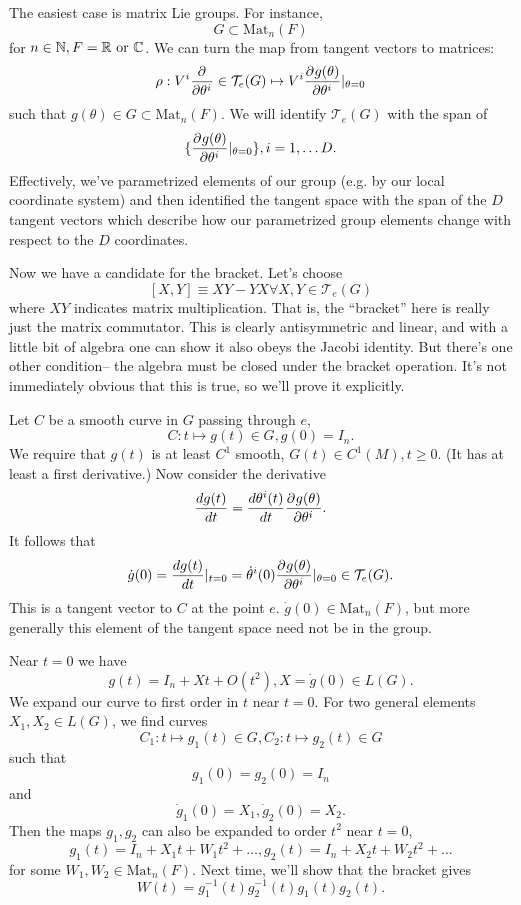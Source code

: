 \begin{exm}
The easiest case is matrix Lie groups. For instance,
$$G\subset \text{Mat}_n(F)$$
for $n\in \NN, F= \RR \text{ or } \CC$. We can turn the map from tangent vectors to matrices:
$$\rho: V^i \P{}{{\theta^i}} \in \mathcal{T}_e(G) \mapsto V^i \P{g(\theta)}{{\theta^i}} |_{\theta=0}$$
such that $g(\theta)\in G \subset \text{Mat}_n(F)$. We will identify $\mathcal{T}_e(G)$ with the span of
$$\set{\P{g(\theta)}{{\theta^i}}|_{\theta=0}},i=1,\ldots D.$$
Effectively, we've parametrized elements of our group (e.g. by our local coordinate system) and then identified the tangent space with the span of the $D$ tangent vectors which describe how our parametrized group elements change with respect to the $D$ coordinates.

Now we have a candidate for the bracket. Let's choose
$$[X,Y]\equiv XY-YX \forall X,Y \in \mathcal{T}_e(G)$$
where $XY$ indicates matrix multiplication. That is, the ``bracket'' here is really just the matrix commutator. This is clearly antisymmetric and linear, and with a little bit of algebra one can show it also obeys the Jacobi identity. But there's one other condition-- the algebra must be closed under the bracket operation. It's not immediately obvious that this is true, so we'll prove it explicitly.

Let $C$ be a smooth curve in $G$ passing through $e$,
$$C:t\mapsto g(t) \in G, g(0)= I_n.$$
We require that $g(t)$ is at least $C^1$ smooth, $G(t)\in C^1(M), t\geq 0.$ (It has at least a first derivative.) Now consider the derivative
$$\frac{dg(t)}{dt}=\frac{d\theta^i(t)}{dt}\P{g(\theta)}{{\theta^i}}.$$
It follows that
$$\dot g(0)=\frac{dg(t)}{dt}|_{t=0}=\dot \theta^i(0)\P{g(\theta)}{{\theta^i}}|_{\theta=0}\in \mathcal{T}_e(G).$$
This is a tangent vector to $C$ at the point $e$. $\dot g(0)\in \text{Mat}_n(F)$, but more generally this element of the tangent space need not be in the group. %

Near $t=0$ we have
$$g(t)=I_n+X t+ O(t^2), X= \dot g(0)\in L(G).$$
We expand our curve to first order in $t$ near $t=0$. For two general elements $X_1,X_2\in L(G)$, we find curves
$$C_1:t\mapsto g_1(t)\in G, C_2: t\mapsto g_2(t)\in G$$
such that $$g_1(0)=g_2(0)=I_n$$ and $$ \dot g_1(0)= X_1, \dot g_2(0)=X_2.$$
Then the maps $g_1,g_2$ can also be expanded to order $t^2$ near $t=0$,
$$g_1(t)=I_n+X_1 t+W_1 t^2+\ldots,g_2(t)=I_n+X_2 t+W_2 t^2+\ldots$$
for some $W_1,W_2\in \text{Mat}_n(F)$. Next time, we'll show that the bracket gives
$$W(t)=g_1^{-1}(t) g_2^{-1}(t)g_1(t) g_2(t).$$
\end{exm}